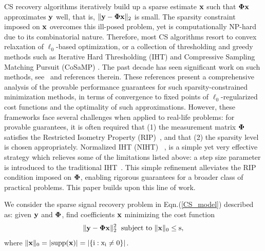 \documentclass{article}
\begin{document}
CS recovery algorithms iteratively build up a sparse estimate ${\bf x}$ such that ${\bf \Phi}  {\bf x}$ approximates ${\bf y}$ well, that is,  $\| {\bf y}- {\bf \Phi}  {\bf x} \|_2$ is small. The sparsity constraint imposed on ${\bf x}$ overcomes this ill-posed problem, yet is computationally NP-hard due to its combinatorial nature. 
Therefore, most CS algorithms resort to convex relaxation of $\ell_0$-based optimization, or a collection of thresholding and greedy methods such as Iterative Hard Thresholding (IHT) \cite{blumensath2008iht, blumensath2009iht} and Compressive Sampling Matching Pursuit (CoSaMP) \cite{needel2008cosamp}. The past decade has seen significant work on such methods, see~\cite{liu2017dualiht, yuan2014ht, yuan2016htp, blumensath2013cs, needel2008cosamp} and references therein. These references present a comprehensive analysis of the provable performance guarantees for such sparsity-constrained minimization methods, in terms of convergence to fixed points of $\ell_0$-regularized cost functions and the optimality of such approximations. However, these frameworks face several challenges when applied to real-life problems: for provable guarantees, it is often required that (1) the measurement matrix ${\bf \Phi}$ satisfies the Restricted Isometry Property (RIP)~\cite{candes2008rip, chartrand2008rip}, and that (2) the sparsity level is chosen appropriately. 
Normalized IHT (NIHT)~ \cite{blumensath2010niht}, is a simple yet very effective strategy  which relieves some of the limitations listed above: a step size parameter is introduced to the traditional IHT~\cite{blumensath2008iht}. This simple refinement alleviates the RIP condition imposed on ${\bf \Phi}$, enabling rigorous guarantees for a broader class of practical problems. {This paper
builds upon this line of work.}


 We consider the sparse signal recovery problem in Eqn.(\ref{CS_model}) described as: given ${\bf y}$ and ${\bf \Phi}$, find coefficients ${\bf x}$ minimizing the cost function
 \begin{equation}\label{cost_function}
 \small
     \|{\bf y} - {\bf \Phi x} \|_2^2 \ \ \rm{subject \ to \ \|{\bf x} \|_0 \leq s},
 \end{equation}
 where $\|{\bf x} \|_0 = |\rm{supp}({\bf x})| = |\{i: x_i\neq 0 \}|$.
 

\end{document}
